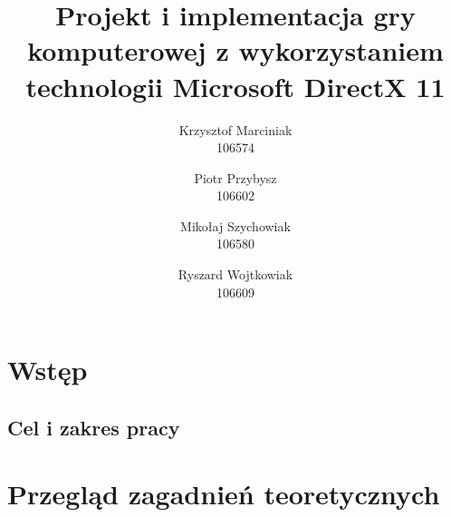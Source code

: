 \documentclass[10pt,a4paper,onecolumn]{article}
\begin{document}
        
        
%        
%        
%        
%        
%        
%        
%        
\title{\textbf{Projekt i implementacja gry komputerowej z wykorzystaniem technologii Microsoft DirectX 11}}
\author{Krzysztof Marciniak \\ 106574
\and Piotr Przybysz \\ 106602
\and Mikołaj Szychowiak \\ 106580
\and Ryszard Wojtkowiak \\ 106609}
\maketitle
\pagebreak

\tableofcontents
\pagebreak

\section{Wstęp}
\subsection{Cel i zakres pracy}

\section{Przegląd zagadnień teoretycznych}
\end{document}
